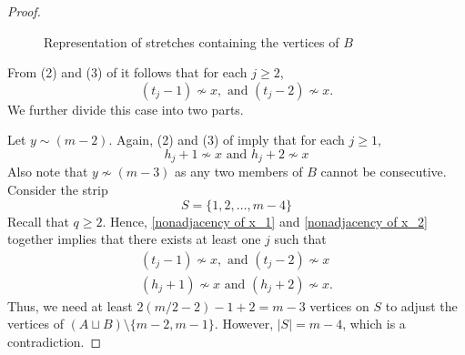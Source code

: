\documentclass[12pt]{article}
\theoremstyle{definition}
\begin{document}
\begin{proof}
\begin{figure}[H]
    \caption{Representation of stretches containing the vertices of $B$}
    \label{fig:cycle_strech}
\end{figure}









From (2) and (3) of  it follows that for each $j\geq 2$, 
\begin{equation}\label{nonadjacency of x_1}
    (t_{j}-1)\nsim x, \text{ and } (t_{j}-2)\nsim x.
\end{equation}
We further divide this case into two parts.

Let $y\sim (m-2)$. Again, (2) and (3) of  imply that for each $j\geq 1$, 
\begin{equation}\label{nonadjacency of x_2}
    h_{j}+1\nsim x \text{ and } h_{j}+2\nsim x
\end{equation}
Also note that $y\nsim (m-3)$ as any two members of $B$ cannot be consecutive. Consider the strip 
\begin{equation*}
    S=\{1,2,\ldots, m-4\}
\end{equation*}
Recall that $q\geq 2$. Hence, \eqref{nonadjacency of x_1} and \eqref{nonadjacency of x_2} together implies that there exists at least one $j$ such that
\begin{align}
 (t_{j}-1)\nsim x, \text{ and } (t_{j}-2)\nsim x\\
    (h_{j}+1)\nsim x \text{ and } (h_{j}+2)\nsim x.
\end{align}
Thus, we need at least $2(m/2-2)-1+2=m-3$ vertices on $S$ to adjust the vertices of $(A\sqcup B)\setminus \{m-2,m-1\}$. However, $|S|=m-4$, which is a contradiction.


\end{proof}
\end{document}
